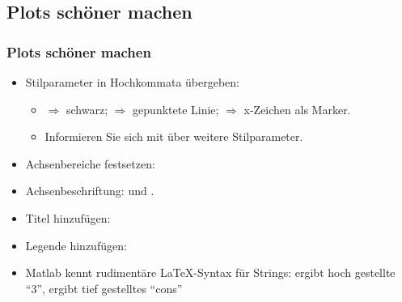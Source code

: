       \subsection{Plots schöner machen}
      \begin{frame}
          \frametitle{Plots schöner machen}

          \vspace{-1.0cm}

          \begin{itemize}
              \item Stilparameter in Hochkommata übergeben: 
              \begin{itemize}
                  \item {} $\Rightarrow$ schwarz; \matlabInput{:} $\Rightarrow$ gepunktete Linie;  $\Rightarrow$ x-Zeichen als Marker.
                  \item Informieren Sie sich mit  über weitere Stilparameter.
              \end{itemize}
              \item Achsenbereiche festsetzen: 
              \item Achsenbeschriftung:  und .
              \item Titel hinzufügen: 
              \item Legende hinzufügen: 
              \item Matlab kennt rudimentäre LaTeX-Syntax für Strings:  ergibt hoch gestellte ``3'',
               ergibt tief gestelltes ``cons''
          \end{itemize}
      \end{frame}

